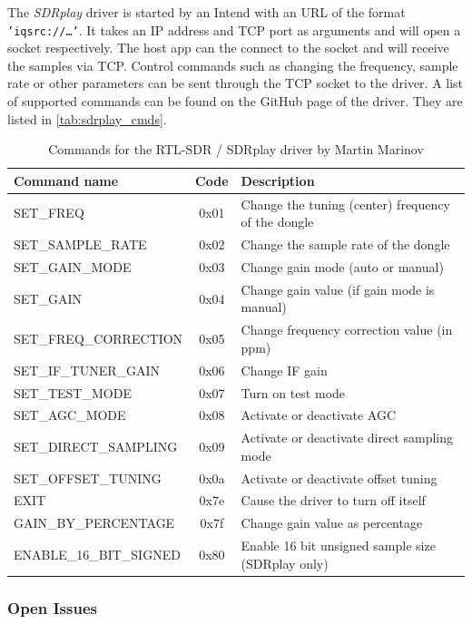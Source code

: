 The \emph{SDRplay} driver is started by an Intend with an URL of the format
\texttt{'iqsrc://\ldots'}. It takes an IP address and TCP port as arguments and
will open a socket respectively. The host app can the connect to the socket and
will receive the samples via TCP. Control commands such as changing the
frequency, sample rate or other parameters can be sent through the TCP socket
to the driver. A list of supported commands can be found on the GitHub page
of the driver. They are listed in \autoref{tab:sdrplay_cmds}.


\begin{table}
	\begin{center}
		\begin{tabular}{l c l}
			Command name & Code & Description \\\hline
			SET\_FREQ & 0x01 & Change the tuning (center) frequency of the dongle \\
			SET\_SAMPLE\_RATE & 0x02 & Change the sample rate of the dongle \\
			SET\_GAIN\_MODE & 0x03 & Change gain mode (auto or manual) \\
			SET\_GAIN & 0x04 & Change gain value (if gain mode is manual) \\
			SET\_FREQ\_CORRECTION & 0x05 & Change frequency correction value (in ppm) \\
			SET\_IF\_TUNER\_GAIN & 0x06 & Change \ac{IF} gain \\
			SET\_TEST\_MODE & 0x07 & Turn on test mode \\
			SET\_AGC\_MODE & 0x08 & Activate or deactivate \ac{AGC} \\
			SET\_DIRECT\_SAMPLING & 0x09 & Activate or deactivate direct sampling mode \\
			SET\_OFFSET\_TUNING & 0x0a & Activate or deactivate offset tuning \\
			EXIT & 0x7e & Cause the driver to turn off itself \\
			GAIN\_BY\_PERCENTAGE & 0x7f & Change gain value as percentage \\
			ENABLE\_16\_BIT\_SIGNED & 0x80 & Enable 16 bit unsigned sample size (SDRplay only) \\\hline
		\end{tabular}
		\caption{Commands for the RTL-SDR / SDRplay driver by Martin Marinov}
		\label{tab:sdrplay_cmds}
	\end{center}
\end{table}



\subsubsection{Open Issues}


